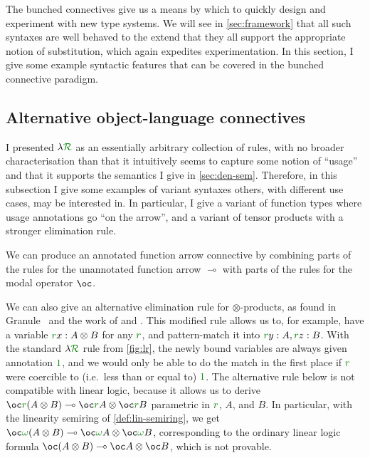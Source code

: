 The bunched connectives give us a means by which to quickly design and
experiment with new type systems.
We will see in \cref{sec:framework} that all such syntaxes are well behaved to
the extend that they all support the appropriate notion of substitution, which
again expedites experimentation.
In this section, I give some example syntactic features that can be covered in
the bunched connective paradigm.

\subsection{Alternative object-language connectives}\label{sec:alt}

I presented $\name$ as an essentially arbitrary collection of rules, with no
broader characterisation than that it intuitively seems to capture some notion
of ``usage'' and that it supports the semantics I give in \cref{sec:den-sem}.
Therefore, in this subsection I give some examples of variant syntaxes others,
with different use cases, may be interested in.
In particular, I give a variant of function types where usage annotations go
``on the arrow'', and a variant of tensor products with a stronger elimination
rule.

We can produce an annotated function arrow connective by combining parts of the
rules for the unannotated function arrow $\multimap$ with parts of the rules for
the modal operator $\oc$.


We can also give an alternative elimination rule for $\otimes$-products, as
found in Granule~\citep{Granule18,HMWO21} and the work of
\citet{AbelBernardy2020} and \citet{reed10distance}.
This modified rule allows us to, for example, have a variable
$\gr rx : A \otimes B$ for any $\gr r$, and pattern-match it into
$\gr ry : A, \gr rz : B$.
With the standard $\name$ rule from \cref{fig:lr}, the newly bound variables are
always given annotation $\gr 1$, and we would only be able to do the match in
the first place if $\gr r$ were coercible to (i.e.\ less than or equal to)
$\gr1$.
The alternative rule below is not compatible with linear logic, because it
allows us to derive
$\oc\gr r\plr{A \otimes B} \multimap \oc\gr rA \otimes \oc\gr r B$
parametric in $\gr r$, $A$, and $B$.
In particular, with the linearity semiring of \cref{def:lin-semiring}, we get
$\oc\gr\omega\plr{A \otimes B} \multimap \oc\gr\omega A \otimes \oc\gr\omega B$,
corresponding to the ordinary linear logic formula
$\oc\plr{A \otimes B} \multimap \oc A \otimes \oc B$, which is not provable.

